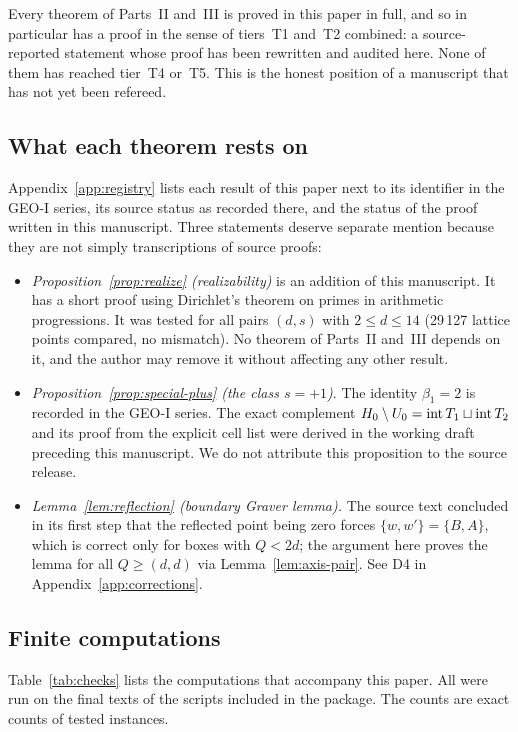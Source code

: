 Every theorem of Parts~II and~III is proved in this paper in full, and so in particular has a proof in the sense of tiers~T1 and~T2 combined: a source-reported statement whose proof has been rewritten and audited here. None of them has reached tier~T4 or~T5. This is the honest position of a manuscript that has not yet been refereed.

\subsection{What each theorem rests on}

Appendix~\ref{app:registry} lists each result of this paper next to its identifier in the GEO-I series, its source status as recorded there, and the status of the proof written in this manuscript. Three statements deserve separate mention because they are not simply transcriptions of source proofs:

\begin{itemize}
\item \emph{Proposition~\ref{prop:realize} (realizability)} is an addition of this manuscript. It has a short proof using Dirichlet's theorem on primes in arithmetic progressions. It was tested for all pairs $(d,s)$ with $2\le d\le14$ (29\,127 lattice points compared, no mismatch). No theorem of Parts~II and~III depends on it, and the author may remove it without affecting any other result.
\item \emph{Proposition~\ref{prop:special-plus} (the class $s=+1$)}. The identity $\beta_1=2$ is recorded in the GEO-I series. The exact complement $H_0\setminus U_0=\operatorname{int} T_1\sqcup\operatorname{int} T_2$ and its proof from the explicit cell list were derived in the working draft preceding this manuscript. We do not attribute this proposition to the source release.
\item \emph{Lemma~\ref{lem:reflection} (boundary Graver lemma).} The source text concluded in its first step that the reflected point being zero forces $\{w,w'\}=\{B,A\}$, which is correct only for boxes with $Q<2d$; the argument here proves the lemma for all $Q\ge(d,d)$ via Lemma~\ref{lem:axis-pair}. See D4 in Appendix~\ref{app:corrections}.
\end{itemize}

\subsection{Finite computations}

Table~\ref{tab:checks} lists the computations that accompany this paper. All were run on the final texts of the scripts included in the package. The counts are exact counts of tested instances.

